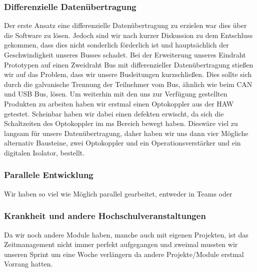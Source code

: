 \subsubsection{Differenzielle Datenübertragung}
Der erste Ansatz eine differenzielle Datenübertragung zu erzielen war dies über die Software zu lösen. Jedoch sind wir nach kurzer Diskussion zu dem Entschluss gekommen, dass dies nicht sonderlich förderlich ist und hauptsächlich der Geschwindigkeit unseres Busses schadet.
Bei der Erweiterung unseres Eindraht Prototypen auf einen Zweidraht Bus mit differenzieller Datenübertragung stießen wir auf das Problem, dass wir unsere Busleitungen kurzschließen. Dies sollte sich durch die galvanische Trennung der Teilnehmer vom Bus, ähnlich wie beim CAN und USB Bus, lösen.
Um weiterhin mit den uns zur Verfügung gestellten Produkten zu arbeiten haben wir erstmal einen Optokoppler aus der HAW getestet. Scheinbar haben wir dabei einen defekten erwischt, da sich die Schaltzeiten des Optokoppler im ms Bereich bewegt haben. Dieswäre viel zu langsam für unsere Datenübertragung, daher haben wir uns dann vier Mögliche alternativ Bausteine, zwei Optokoppler und ein Operationsverstärker und ein digitalen Isolator, bestellt. \\

\subsubsection{Parallele Entwicklung}
Wir haben so viel wie Möglich parallel gearbeitet, entweder in Teams oder 


\subsubsection{Krankheit und andere Hochschulveranstaltungen}
Da wir noch andere Module haben, manche auch mit eigenen Projekten, ist das Zeitmanagement nicht immer perfekt aufgegangen und zweimal mussten wir unseren Sprint um eine Woche verlängern da andere Projekte/Module erstmal Vorrang hatten.


